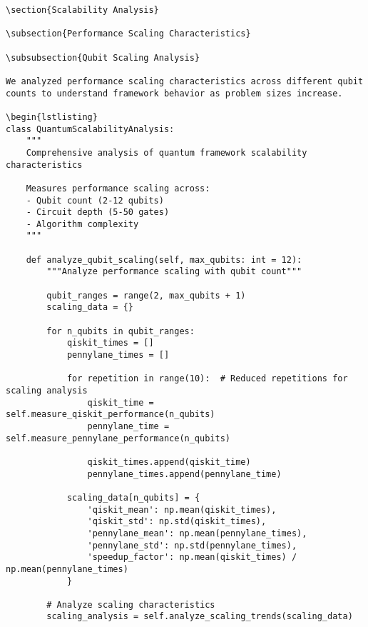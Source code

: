 \documentclass[12pt,a4paper]{report}
\begin{document}
\begin{lstlisting}
\section{Scalability Analysis}

\subsection{Performance Scaling Characteristics}

\subsubsection{Qubit Scaling Analysis}

We analyzed performance scaling characteristics across different qubit counts to understand framework behavior as problem sizes increase.

\begin{lstlisting}
class QuantumScalabilityAnalysis:
    """
    Comprehensive analysis of quantum framework scalability characteristics

    Measures performance scaling across:
    - Qubit count (2-12 qubits)
    - Circuit depth (5-50 gates)
    - Algorithm complexity
    """

    def analyze_qubit_scaling(self, max_qubits: int = 12):
        """Analyze performance scaling with qubit count"""

        qubit_ranges = range(2, max_qubits + 1)
        scaling_data = {}

        for n_qubits in qubit_ranges:
            qiskit_times = []
            pennylane_times = []

            for repetition in range(10):  # Reduced repetitions for scaling analysis
                qiskit_time = self.measure_qiskit_performance(n_qubits)
                pennylane_time = self.measure_pennylane_performance(n_qubits)

                qiskit_times.append(qiskit_time)
                pennylane_times.append(pennylane_time)

            scaling_data[n_qubits] = {
                'qiskit_mean': np.mean(qiskit_times),
                'qiskit_std': np.std(qiskit_times),
                'pennylane_mean': np.mean(pennylane_times),
                'pennylane_std': np.std(pennylane_times),
                'speedup_factor': np.mean(qiskit_times) / np.mean(pennylane_times)
            }

        # Analyze scaling characteristics
        scaling_analysis = self.analyze_scaling_trends(scaling_data)


\end{lstlisting}
\end{document}
